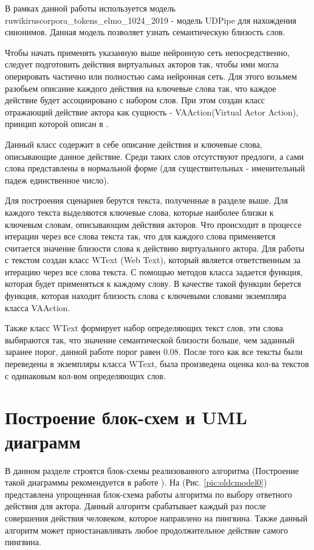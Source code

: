 В рамках данной работы используется модель ruwikiruscorpora\_tokens\_elmo\_1024\_2019 - модель UDPipe для нахождения синонимов. 
Данная модель позволяет узнать семантическую близость слов.

Чтобы начать применять указанную выше нейронную сеть непосредственно, следует подготовить действия виртуальных акторов так, 
чтобы ими могла оперировать частично или полностью сама нейронная сеть. Для этого возьмем разобьем описание каждого действия 
на ключевые слова так, что каждое действие будет ассоциировано с набором слов. При этом создан класс отражающий действие 
актора как сущность - VAAction(Virtual Actor Action), принцип которой описан в \cite{w2vec01}.

Данный класс содержит в себе описание действия и ключевые слова, описывающие данное действие. 
Среди таких слов отсутствуют предлоги, а сами слова представлены в нормальной форме 
(для существительных - именительный падеж единственное число).

Для построения сценариев берутся текста, полученные в разделе выше. Для каждого текста выделяются ключевые слова, 
которые наиболее близки к ключевым словам, описывающим действия акторов. Что происходит в процессе итерации через 
все слова текста так, что для каждого слова применяется считается значение близости слова к действию виртуального 
актора. Для работы с текстом создан класс WText (Web Text), который является ответственным за итерацию через все 
слова текста. С помощью методов класса задается функция, которая будет применяться к каждому слову. В качестве 
такой функции берется функция, которая находит близость слова с ключевыми словами экземпляра класса VAAction.

Также класс WText формирует набор определяющих текст слов, эти слова выбираются так, что значение 
семантической близости больше, чем заданный заранее порог, данной работе порог равен 0.08. После 
того как все тексты были переведены в экземпляры класса WText, была произведена оценка кол-ва 
текстов с одинаковым кол-вом определяющих слов.

\section{Построение блок-схем и UML диаграмм}

В данном разделе строятся блок-схемы реализованного алгоритма (Построение такой диаграммы рекомендуется в работе \cite{OOP}).
На (Рис. \ref{pic:oldcmodel0}) представлена упрощенная блок-схема работы алгоритма по выбору ответного действия для актора.
Данный алгоритм срабатывает каждый раз после совершения действия человеком, которое направлено на пингвина.
Также данный алгоритм может приостанавливать любое продолжительное действие самого пингвина. 

